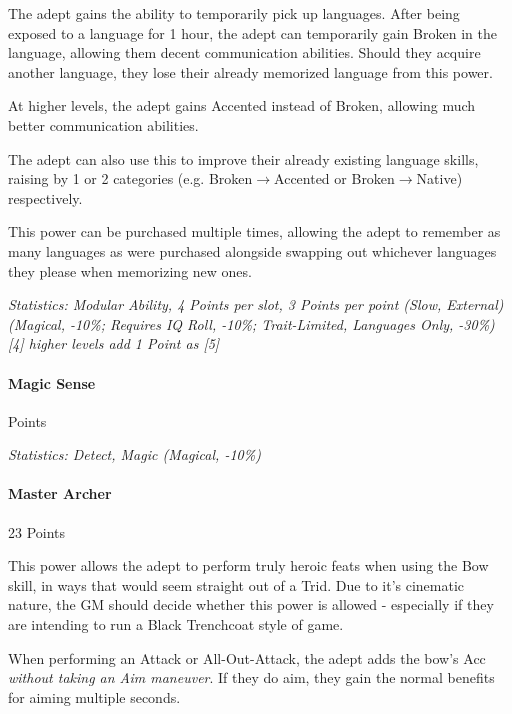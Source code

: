 \begin{multicols}{3}
		The adept gains the ability to temporarily pick up languages. After being exposed to a language for 1 hour, the adept can temporarily gain Broken in the language, allowing them decent communication abilities. Should they acquire another language, they lose their already memorized language from this power.
		
		At higher levels, the adept gains Accented instead of Broken, allowing much better communication abilities.
		
		The adept can also use this to improve their already existing language skills, raising by 1 or 2 categories (e.g. Broken$\rightarrow$Accented or Broken$\rightarrow$Native) respectively.
		
		This power can be purchased multiple times, allowing the adept to remember as many languages as were purchased alongside swapping out whichever languages they please when memorizing new ones.

		\textcolor{OliveGreen}{\textit{Statistics: Modular Ability, 4 Points per slot, 3 Points per point (Slow, External) (Magical, -10\%; Requires IQ Roll, -10\%; Trait-Limited, Languages Only, -30\%) [4] higher levels add 1 Point as [5]}}
	
	\paragraph{Magic Sense}
	\begin{flushright}
		Points
	\end{flushright}

		\textcolor{OliveGreen}{\textit{Statistics: Detect, Magic (Magical, -10\%) }}
	
	\paragraph{Master Archer}
	\begin{flushright}
		23 Points
	\end{flushright}

		This power allows the adept to perform truly heroic feats when using the Bow skill, in ways that would seem straight out of a Trid. Due to it's cinematic nature, the GM should decide whether this power is allowed - especially if they are intending to run a Black Trenchcoat style of game.
		
		When performing an Attack or All-Out-Attack, the adept adds the bow's Acc \textit{without taking an Aim maneuver}. If they do aim, they gain the normal benefits for aiming multiple seconds.
		

\end{multicols}
